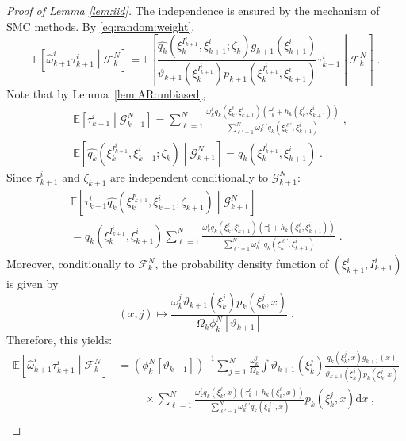 \documentclass[12pt]{article}
\newcommand{\rmd}{\mathrm{d}}
\newcommand{\eqsp}{\;}
\newcommand{\1}{\mathrm{1}}
\newcommand{\qk}{q_{k}}
\begin{document}
\begin{proof}[Proof of Lemma \ref{lem:iid}]
The independence is ensured by the mechanism of SMC methods. By \eqref{eq:random:weight},
\[
\mathbb{E}\left[\widehat{\omega}^i_{k+1}\tau^{i}_{k+1}\middle| \mathcal{F}_k^{N}\right] = \mathbb{E}\left[\frac{ \widehat{\qk}(\xi_{k}^{I^{i}_{k+1}}, \xi^{i}_{k+1};\zeta_{k})g_{k+1}(\xi^{i}_{k+1})}{\vartheta_{k+1}(\xi^{I^{i}_{k+1}}_{k}) p_{k+1}(\xi_{k}^{I^{i}_{k+1}},\xi^{i}_{k+1})}\tau^{i}_{k+1}\middle| \mathcal{F}_k^{N}\right]\eqsp.
\]
Note that by Lemma~\ref{lem:AR:unbiased},
\begin{align*}
&\mathbb{E}\left[\tau^{i}_{k+1}\middle|\mathcal{G}_{k+1}^{N}\right]
 = \sum_{\ell=1}^N\frac{\omega_k^{\ell} \qk(\xi_{k}^{\ell}, \xi^{i}_{k+1}) \left(\tau^{\ell}_k + h_{k}(\xi_{k}^{\ell},\xi^{i}_{k+1})\right)}{\sum_{\ell'=1}^N\omega_k^{\ell'} \qk(\xi_{k}^{\ell'},\xi^{i}_{k+1})}\eqsp,\\
&\mathbb{E} \left[\widehat{\qk}(\xi_{k}^{I^{i}_{k+1}},\xi^{i}_{k+1};\zeta_{k}) \middle| \mathcal{G}_{k+1}^{N}\right]
 = \qk(\xi_{k}^{I^{i}_{k+1}},\xi^{i}_{k+1})\eqsp.
\end{align*}
Since $\tau^{i}_{k+1}$ and $\zeta_{k+1}$ are independent conditionally to $\mathcal{G}_{k+1}^{N}$:
\begin{multline*}
\mathbb{E}\left[\tau^{i}_{k+1} \widehat{\qk} (\xi_{k}^{I^{i}_{k+1}},\xi^{i}_{k+1};\zeta_{k+1})\middle|\mathcal{G}_{k+1}^{N}\right]\\
 = q_k(\xi_{k}^{I^{i}_{k+1}},\xi^{i}_{k+1})\sum_{\ell=1}^N\frac{\omega_k^{\ell} \qk (\xi_{k}^{\ell},\xi^{i}_{k+1})\left(\tau^{\ell}_k + h_{k}(\xi_{k}^{\ell},\xi^{i}_{k+1})\right)}{\sum_{\ell'=1}^N\omega_k^{\ell'} \qk (\xi_{k}^{\ell'},\xi^{i}_{k+1})}\eqsp.
\end{multline*}
Moreover, conditionally to $\mathcal{F}_k^N$, the probability density function of $(\xi_{k+1}^i,I_{k+1}^i)$ is given by
\[
(x,j) \mapsto \frac{\omega_k^j\vartheta_{k+1}(\xi_k^j)p_k(\xi_k^j,x)}{\Omega_k\phi_k^N[\vartheta_{k+1}]}\eqsp.
\]
Therefore, this yields:
\begin{align*}
\mathbb{E}\left[\widehat{\omega}^i_{k+1}\tau^{i}_{k+1}\middle| \mathcal{F}_k^{N}\right]&= \left(\phi^N_{k}[\vartheta_{k+1}]\right)^{-1} \sum_{j=1}^N\frac{\omega_k^j}{\Omega_k} \int \vartheta_{k+1}(\xi^{j}_{k})\frac{\qk(\xi_{k}^{j},x) g_{k+1}(x)}{\vartheta_{k+1}(\xi^{j}_{k}) p_{k}(\xi_{k}^{j},x)}\\
&\hspace{1cm}\times \sum_{\ell=1}^N\frac{\omega_k^{\ell} \qk (\xi_{k}^{\ell},x)\left(\tau^{\ell}_k + h_{k}(\xi_{k}^{\ell},x)\right)}{\sum_{\ell'=1}^N\omega_k^{\ell'}\qk(\xi_{k}^{\ell'},x)}p_{k}(\xi_{k}^{j},x)\rmd x\eqsp,\\

\end{align*}
\end{proof}
\end{document}
